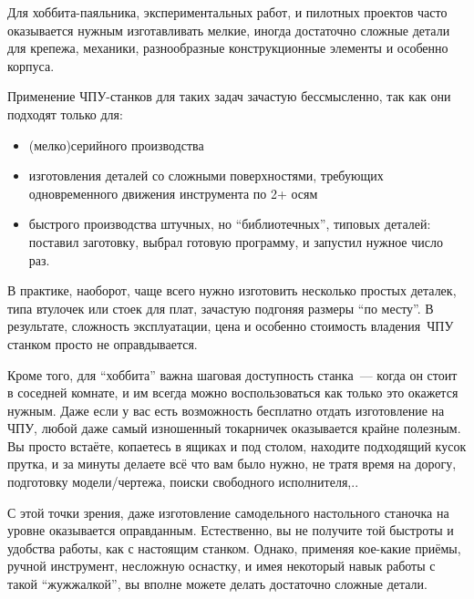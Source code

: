 \pagebreak
{}

Для хоббита-паяльника, экспериментальных работ, и пилотных проектов часто
оказывается нужным изготавливать мелкие, иногда достаточно сложные детали для
крепежа, механики, разнообразные конструкционные элементы и особенно корпуса.

\medskip
Применение ЧПУ-станков для таких задач зачастую бессмысленно, так как они
подходят только для:
\begin{itemize}[nosep]
    \item (мелко)серийного производства
    \item изготовления деталей со сложными поверхностями, требующих
    одновременного движения инструмента по 2+ осям
    \item быстрого производства штучных, но ``библиотечных'', типовых деталей:
    поставил заготовку, выбрал готовую программу, и запустил нужное число раз.
\end{itemize}

\pagebreak
В практике, наоборот, чаще всего нужно изготовить несколько простых деталек,
типа втулочек или стоек для плат, зачастую подгоняя размеры ``по месту''. В
результате, сложность эксплуатации, цена и особенно стоимость
владения\ ЧПУ
станком просто не оправдывается.

Кроме того, для ``хоббита'' важна шаговая доступность станка\ --- когда он стоит
в соседней комнате, и им всегда можно воспользоваться как только это окажется
нужным. Даже если у вас есть возможность бесплатно отдать изготовление на ЧПУ, любой даже самый изношенный
токарничек оказывается крайне полезным. Вы просто встаёте, копаетесь в ящиках и
под столом, находите подходящий кусок прутка, и за минуты делаете всё что вам
было нужно, не тратя время на дорогу, подготовку модели/чертежа, поиски
свободного исполнителя,..

С этой точки зрения, даже изготовление самодельного настольного станочка на
уровне  оказывается оправданным. Естественно, вы не
получите той быстроты и удобства работы, как с настоящим станком. Однако,
применяя кое-какие приёмы, ручной инструмент, несложную оснастку, и имея
некоторый навык работы с такой ``жужжалкой'', вы вполне можете делать достаточно
сложные детали.

\begin{center}
\end{center}

